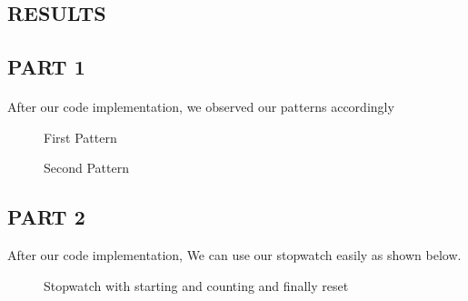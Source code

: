 \documentclass[pdftex,12pt,a4paper]{article}
\begin{document}
\begin{flushleft}
\newpage
\section{RESULTS}
\subsection{PART 1}
\paragraph{}
After our code implementation, we observed our patterns accordingly
\begin{figure}[H]
    \centering
    \caption{First Pattern}
    \label{fig:part1-simulation}
\end{figure}

\begin{figure}[H]
    \centering
    \caption{Second Pattern}
    \label{fig:part1-simulation}
\end{figure}
\newpage
\subsection{PART 2}
After our code implementation, We can use our stopwatch easily as shown below.

\begin{figure}[H]
    \centering
    \centering
    \caption{Stopwatch with starting and counting and finally reset}
    \label{fig:part2-right-simulation}
\end{figure}
\end{flushleft}
\end{document}
